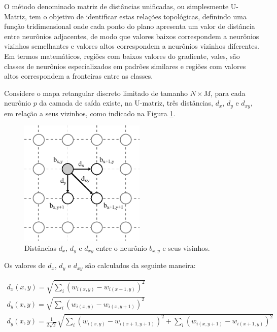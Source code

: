 O método denominado matriz de distâncias unificadas, ou simplesmente U-Matriz,
tem o objetivo de identificar estas relações topológicas, definindo uma função
tridimensional onde cada ponto do plano apresenta um valor de distância entre
neurônios adjacentes, de modo que valores baixos correspondem a neurônios
vizinhos semelhantes e valores altos correspondem a neurônios vizinhos
diferentes. Em termos matemáticos, regiões com baixos valores do gradiente,
vales, são classes de neurônios especializados em padrões similares e regiões
com valores altos correspondem a fronteiras entre as classes.

Considere o mapa retangular discreto limitado de tamanho $ N \times M $, para cada
neurônio $ p $ da camada de saída existe, na U-matriz, três distâncias, $ d_x $,
$ d_y $ e  $ d_{xy} $, em relação a seus vizinhos, como indicado na Figura \ref{fig:dxdydxy}.

\begin{figure}[H]
  \begin{center}
    \includegraphics[height=6cm]{imagens/dxdydxy.pdf}
  \end{center}
  \caption{ Distâncias $ d_x $, $ d_y $ e $ d_{xy} $ entre o neurônio $ b_{x,y} $
    e seus visinhos. }
  \label{fig:dxdydxy}
\end{figure}

Os valores de $ d_x $, $ d_y $ e $ d_{xy} $ são calculados da seguinte maneira:

\begin{subequations}\label{eq:dxdydxy}
\begin{align}
  d_x(x, y) = \sqrt{\sum_i{ \left( w_{i(x,y)} - w_{i(x + 1, y)} \right)^2 }}\\
  d_y(x, y) = \sqrt{\sum_i{ \left( w_{i(x,y)} - w_{i(x, y + 1)} \right)^2 }}\\
  d_y(x, y) = \frac{1}{2\sqrt{2}}\sqrt{\sum_i{ \left( w_{i(x,y)} - w_{i(x + 1, y + 1)} \right)^2 } + \sum_i{ \left( w_{i(x,y + 1)} - w_{i(x + 1, y)} \right)^2 } }
\end{align}
\end{subequations}

